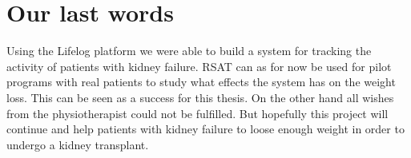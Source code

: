 \documentclass{cslthse-msc}
\begin{document}



\section{Our last words}

Using the Lifelog platform we were able to build a system for tracking the activity of patients with kidney failure. RSAT can as for now be used for pilot programs with real patients to study what effects the system has on the weight loss. This can be seen as a success for this thesis. On the other hand all wishes from the physiotherapist could not be fulfilled. But hopefully this project will continue and help patients with kidney failure to loose enough weight in order to undergo a kidney transplant.



   
\end{document}
